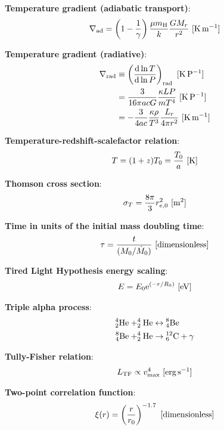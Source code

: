 \documentclass[a4paper,10pt]{article}
\begin{document}
{\noindent}\textbf{Temperature gradient (adiabatic transport)}:
\begin{align*}
    \nabla_{\rm ad} = \left(1-\frac{1}{\gamma}\right) \frac{\mu m_{\rm H}}{k}\frac{GM_r}{r^2} ~ [{\rm K\,m^{-1}}]
\end{align*}

{\noindent}\textbf{Temperature gradient (radiative)}:
\begin{align*}
    \nabla_{\rm rad} &\equiv \left(\frac{{\rm d}\ln T}{{\rm d}\ln P}\right)_{\rm rad} ~ [{\rm K\,P^{-1}}] \\
    &= \frac{3}{16\pi acG}\frac{\kappa LP}{mT^4} ~ [{\rm K\,P^{-1}}] \\
    &= -\frac{3}{4ac}\frac{\kappa\rho}{T^3}\frac{L_r}{4\pi r^2} ~ [{\rm K\,m^{-1}}]
\end{align*}

{\noindent}\textbf{Temperature-redshift-scalefactor relation}:
\begin{align*}
    T = (1+z)T_0 = \frac{T_0}{a} ~ [{\rm K}]
\end{align*}

{\noindent}\textbf{Thomson cross section}:
\begin{align*}
\sigma_T = \frac{8\pi}{3}r_{e,0}^2 ~ [{\rm m^2}]
\end{align*}

{\noindent}\textbf{Time in units of the initial mass doubling time}:
\begin{align*}
    \tau = \frac{t}{(M_0/\dot{M}_0)} ~ [{\rm dimensionless}]
\end{align*}

{\noindent}\textbf{Tired Light Hypothesis energy scaling}:
\begin{align*}
    E = E_0 \mathrm{e}^{(-r/R_0)} ~ [{\rm eV}]
\end{align*}

{\noindent}\textbf{Triple alpha process}:
\begin{align*}
    {\rm ^4_2He + ^4_2He} &\leftrightarrow {\rm ^8_4Be} \\
    {\rm ^8_4Be + ^4_2He} &\rightarrow {\rm ^{12}_6C + \gamma}
\end{align*}

{\noindent}\textbf{Tully-Fisher relation}:
\begin{align*}
    L_\mathrm{TF} \propto v_\mathrm{max}^4 ~ [{\rm erg\,s^{-1}}]
\end{align*}

{\noindent}\textbf{Two-point correlation function}:
\begin{align*}
    \xi(r) = \left(\frac{r}{r_0}\right)^{-1.7} ~ [{\rm dimensionless}] 
\end{align*}
\end{document}
